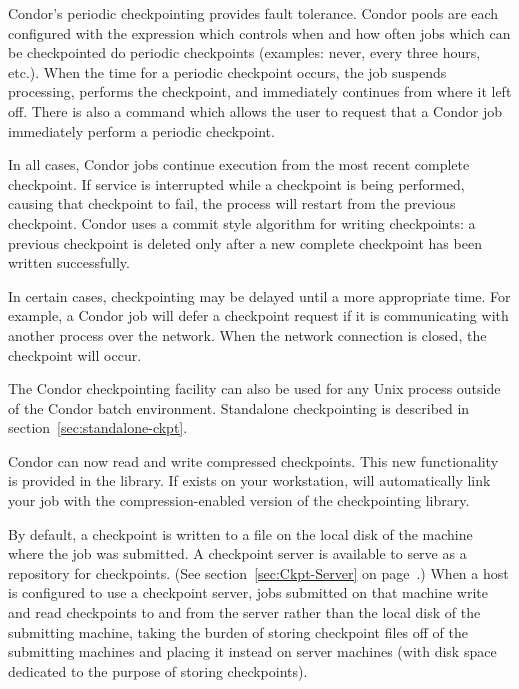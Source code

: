 Condor's periodic checkpointing provides fault tolerance.  Condor
pools are each configured with the 
expression which controls when and how often jobs which can be
checkpointed do periodic checkpoints (examples: never, every three
hours, etc.).  When the time for a periodic checkpoint occurs, the job
suspends processing, performs the checkpoint, and immediately
continues from where it left off.  There is also a  command
which allows the user to request that a Condor job immediately perform
a periodic checkpoint.

In all cases, Condor jobs continue execution from the most recent
complete checkpoint.  If service is interrupted while a checkpoint is
being performed, causing that checkpoint to fail, the process will
restart from the previous checkpoint.  Condor uses a commit style
algorithm for writing checkpoints: a previous checkpoint is deleted
only after a new complete checkpoint has been written successfully.

In certain cases, checkpointing may be delayed until a more appropriate
time.  For example, a Condor job will defer a checkpoint request if
it is communicating with another process over the network.  When the
network connection is closed, the checkpoint will occur.

The Condor checkpointing facility can also be used for any Unix process
outside of the Condor batch environment. Standalone checkpointing
is described in section~\ref{sec:standalone-ckpt}.

Condor can now read and write compressed checkpoints.  This new
functionality is provided in the  library.
If  exists on your workstation, 
will automatically link your job with the compression-enabled version
of the checkpointing library.

By default, a checkpoint is written to a file on the local disk of the
machine where the job was submitted.  A checkpoint server is available
to serve as a repository for checkpoints.  (See
section~\ref{sec:Ckpt-Server} on page~\pageref{sec:Ckpt-Server}.)
When a host is configured to use a checkpoint server, jobs submitted
on that machine write and read checkpoints to and from the server
rather than the local disk of the submitting machine, taking the
burden of storing checkpoint files off of the submitting machines and
placing it instead on server machines (with disk space dedicated to
the purpose of storing checkpoints).

